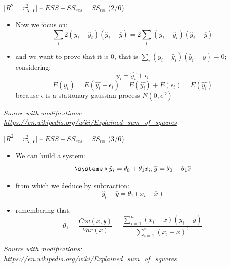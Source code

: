 \documentclass{beamer}
\begin{document}
\begin{frame}
{\centerline{ [$R^2 = r_{X,Y}^2$] -- $ESS + SS_{res} = SS_{tot} $ (2/6)}}

\begin{itemize}
\item Now we focus on:
$$\sum_i2(y_{i}-{\hat {y}}_{i})({\hat {y}}_{i}-{\overline {y}}) = 2\sum_i(y_{i}-{\hat {y}}_{i})({\hat {y}}_{i}-{\overline {y}}) $$
\item and we want to prove that it is 0, that is $\sum_i(y_{i}-{\hat {y}}_{i})({\hat {y}}_{i}-{\overline {y}}) = 0$;  considering:
$$y_i = \hat{y_i} + \epsilon_i$$
$$ E(y_i) = E(\hat{y_i} + \epsilon_i) = E(\hat{y_i}) + E(\epsilon_i) = E(\hat{y_i}) $$
because $\epsilon$ is a stationary gaussian process $N(0,\sigma^2)$

\end{itemize}

\textit{\small
Source with modifications: \url{https://en.wikipedia.org/wiki/Explained_sum_of_squares}}
\end{frame}

\begin{frame}
{\centerline{ [$R^2 = r_{X,Y}^2$] -- $ESS + SS_{res} = SS_{tot} $ (3/6)}}

\begin{itemize}
\item We can build a system:
\[
\systeme*{
\hat{y}_i = \theta_0 + \theta_1 x_i,
\overline{y} = \theta_0 + \theta_1 \overline{x}
}
\]
\item from which we deduce by subtraction:
$$\hat{y}_i - \overline{y} = \theta_1 (x_i - \overline{x})$$
\item remembering that:
$$ \theta_1  = \frac { Cov(x,y)} { Var(x) } = {\frac {\sum _{i=1}^{n}(x_{i}-{\overline {x}})(y_{i}-{\overline {y}})}{\sum _{i=1}^{n}(x_{i}-{\overline {x}})^{2}}}$$
\end{itemize}

\textit{\small
Source with modifications: \url{https://en.wikipedia.org/wiki/Explained_sum_of_squares}}
\end{frame}
\end{document}
